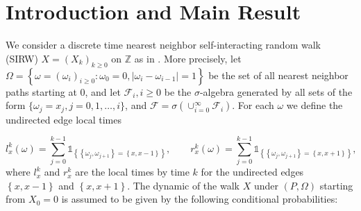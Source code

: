 \documentclass[EJP]{ejpecp} %
\begin{document}


\section{Introduction and Main Result}



We consider a discrete time nearest neighbor self-interacting random walk (SIRW) $X = (X_k)_{k\geq 0}$ on $\mathbb{Z}$ as in \cite{T96,KMP23}. More precisely, let $\Omega = \left\{\omega = (\omega_i)_{i \geq 0}: \omega_0 = 0, |\omega_i - \omega_{i - 1}| = 1 \right\}$ be the set of all nearest neighbor paths starting at 0, and let $\mathcal{F}_i, i \ge 0$ be the $\sigma$-algebra generated by all sets of the form $\{\omega_j = x_j, j = 0, 1, \ldots, i\} $, and $\mathcal{F} = \sigma\left( \cup_{i = 0}^\infty   \mathcal{F}_i\right)$. For each $\omega$ we define the undirected edge local times

\[ 
l_x^k(\omega) = \sum_{j=0}^{k-1} \mathbb{1}_{ \left\{  \left\{\omega_j, \omega_{j+1}\right\} =  \left\{x,x-1\right\} \right\} }, \qquad
r_x^k(\omega) = \sum_{j=0}^{k-1} \mathbb{1}_{ \left\{  \left\{\omega_j, \omega_{j+1}\right\} =  \left\{x,x+1\right\} \right\} }   
,\]
where $l_x^k$ and $r_x^k$ are the local times by time $k$ for the undirected edges $\left\{x,x-1\right\}$ and $\left\{x,x+1\right\}$.
The dynamic of the walk $X$ under $(P, \Omega)$ starting from $X_0 = 0$ is assumed to be given by the following conditional probabilities:
\end{document}
